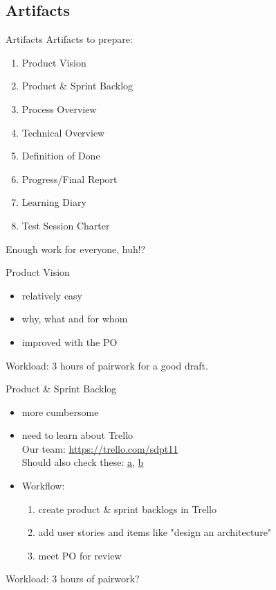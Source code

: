 \documentclass{beamer}
\newcommand{\bgset}[1]{\usebackgroundtemplate{
  \texttt{[image: \#1]}}}
\begin{document}
\subsection{Artifacts}
\begin{frame}{Artifacts}{}
  Artifacts to prepare:
  \begin{enumerate}
  \pause \item Product Vision
  \pause \item Product \& Sprint Backlog
  \pause \item Process Overview
  \pause \item Technical Overview
  \pause \item Definition of Done
  \pause \item Progress/Final Report
  \pause \item Learning Diary
  \pause \item Test Session Charter
  \end{enumerate}
  \pause \alert{Enough work} \pause for \alert{everyone}, huh!?
\end{frame}
\bgset{../gfx/neural1__bgmod.jpg}
\begin{frame}{Product Vision}{}
  \begin{itemize}
  \item relatively easy
  \item why, what and for whom
  \item improved with the PO
  \end{itemize}
  Workload: 3 hours of pairwork for a good draft.
\end{frame}
\begin{frame}{Product \& Sprint Backlog}{}
  \begin{itemize}
  \item more cumbersome
  \item need to learn about Trello \\
    Our team: \url{https://trello.com/sdpt11} \\
    Should also check these:
    \href{http://scrumfortrello.com/}{a},
    \href{http://www.tommasonervegna.com/blog/2014/1/9/10-effective-tips-for-using-trello-as-an-agile-scrum-project-management-tool}{b}
  \item Workflow:
    \begin{enumerate}
    \item create product \& sprint backlogs in Trello
    \item add user stories and items like "design an architecture"
    \item meet PO for review
    \end{enumerate}
  \end{itemize}
  Workload: 3 hours of pairwork?
\end{frame}
\end{document}
